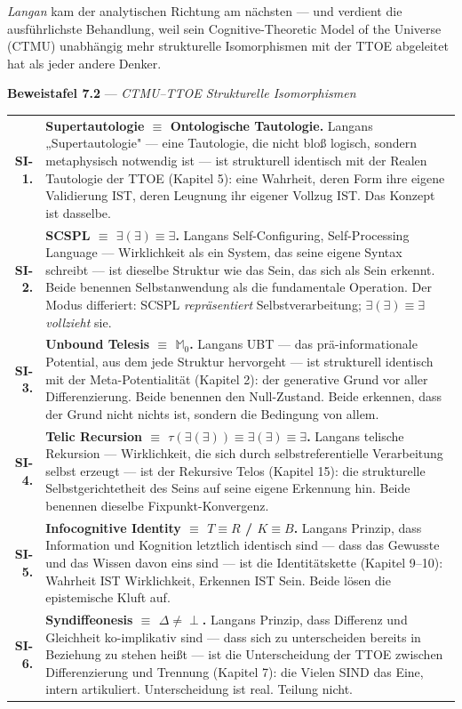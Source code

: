 \documentclass[10pt, openany, oneside]{book}
\renewcommand{\footnotesize}{\fontsize{8.5}{11}\selectfont}
\begin{document}
\textit{Langan} kam der analytischen Richtung am nächsten --- und verdient die ausführlichste Behandlung, weil sein Cognitive-Theoretic Model of the Universe (CTMU) unabhängig mehr strukturelle Isomorphismen mit der TTOE abgeleitet hat als jeder andere Denker.

\pagebreak[3]

\textbf{Beweistafel 7.2} --- \textit{CTMU--TTOE Strukturelle Isomorphismen}

\vspace{0.5em}

{\footnotesize
\noindent\begin{tabular}{r p{}}
\textbf{SI-1.} & \textbf{Supertautologie $\equiv$ Ontologische Tautologie.} Langans „Supertautologie" --- eine Tautologie, die nicht bloß logisch, sondern metaphysisch notwendig ist --- ist strukturell identisch mit der Realen Tautologie der TTOE (Kapitel 5): eine Wahrheit, deren Form ihre eigene Validierung IST, deren Leugnung ihr eigener Vollzug IST. Das Konzept ist dasselbe. \\[0.3em]
\textbf{SI-2.} & \textbf{SCSPL $\equiv$ $\exists(\exists) \equiv \exists$.} Langans Self-Configuring, Self-Processing Language --- Wirklichkeit als ein System, das seine eigene Syntax schreibt --- ist dieselbe Struktur wie das Sein, das sich als Sein erkennt. Beide benennen Selbstanwendung als die fundamentale Operation. Der Modus differiert: SCSPL \textit{repräsentiert} Selbstverarbeitung; $\exists(\exists) \equiv \exists$ \textit{vollzieht} sie. \\[0.3em]
\textbf{SI-3.} & \textbf{Unbound Telesis $\equiv$ $\mathbb{M}_0$.} Langans UBT --- das prä-informationale Potential, aus dem jede Struktur hervorgeht --- ist strukturell identisch mit der Meta-Potentialität (Kapitel 2): der generative Grund vor aller Differenzierung. Beide benennen den Null-Zustand. Beide erkennen, dass der Grund nicht nichts ist, sondern die Bedingung von allem. \\[0.3em]
\textbf{SI-4.} & \textbf{Telic Recursion $\equiv$ $\tau(\exists(\exists)) \equiv \exists(\exists) \equiv \exists$.} Langans telische Rekursion --- Wirklichkeit, die sich durch selbstreferentielle Verarbeitung selbst erzeugt --- ist der Rekursive Telos (Kapitel 15): die strukturelle Selbstgerichtetheit des Seins auf seine eigene Erkennung hin. Beide benennen dieselbe Fixpunkt-Konvergenz. \\[0.3em]
\textbf{SI-5.} & \textbf{Infocognitive Identity $\equiv$ $T \equiv R$ / $K \equiv B$.} Langans Prinzip, dass Information und Kognition letztlich identisch sind --- dass das Gewusste und das Wissen davon eins sind --- ist die Identitätskette (Kapitel 9--10): Wahrheit IST Wirklichkeit, Erkennen IST Sein. Beide lösen die epistemische Kluft auf. \\[0.3em]
\textbf{SI-6.} & \textbf{Syndiffeonesis $\equiv$ $\Delta \neq \perp$.} Langans Prinzip, dass Differenz und Gleichheit ko-implikativ sind --- dass sich zu unterscheiden bereits in Beziehung zu stehen heißt --- ist die Unterscheidung der TTOE zwischen Differenzierung und Trennung (Kapitel 7): die Vielen SIND das Eine, intern artikuliert. Unterscheidung ist real. Teilung nicht. \\[0.3em]
\end{tabular}
}
\end{document}
